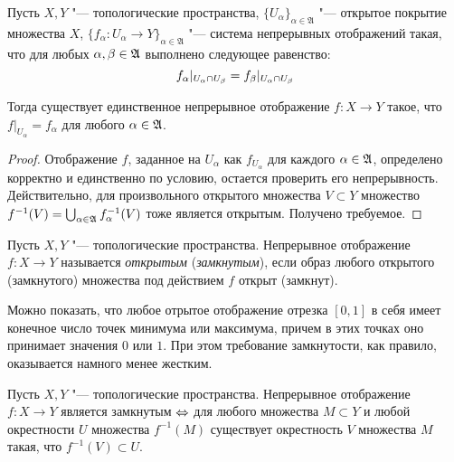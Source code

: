 \begin{theorem}
	Пусть $X, Y$ "--- топологические пространства, $\{U_\alpha \}_{\alpha \in \mathfrak{A}}$ "--- открытое покрытие множества $X$, $\{f_\alpha: U_\alpha \rightarrow Y\}_{\alpha \in \mathfrak{A}}$ "--- сис\-те\-ма непрерывных отображений такая, что для любых $\alpha, \beta \in \mathfrak A$ выполнено следующее равенство:
	\[f_\alpha|_{U_\alpha\cap U_\beta} \hm= f_\beta|_{U_\alpha\cap U_\beta}\]
	
	Тогда существует единственное непрерывное отображение $f: X\rightarrow Y$ такое, что $f|_{U_\alpha} = f_\alpha$ для любого $\alpha \in \mathfrak A$.
\end{theorem}

\begin{proof}
	Отображение $f$, заданное на $U_\alpha$ как $f_{U_\alpha}$ для каждого $\alpha \in \mathfrak A$, определено корректно и единственно по условию, остается проверить его непрерывность. Действительно, для произвольного открытого множества $V \subset Y$ множество $f^{-1}(V) = \bigcup_{\alpha \in \mathfrak A}f_\alpha^{-1}(V)$ тоже является открытым. Получено требуемое.
\end{proof}

\begin{definition}
	Пусть $X, Y$ "--- топологические пространства. Непрерывное отображение $f : X \to Y$ называется \textit{открытым} (\textit{замкнутым}), если образ любого открытого (замкнутого) множества под действием $f$ открыт (замкнут).
\end{definition}

\begin{note}
	Можно показать, что любое отрытое отображение отрезка $[0, 1]$ в себя имеет конечное число точек минимума или максимума, причем в этих точках оно принимает значения $0$ или $1$. При этом требование замкнутости, как правило, оказывается намного менее жестким.
\end{note}

\begin{proposition}
	Пусть $X, Y$ "--- топологические пространства. Непрерывное отображение $f : X \to Y$ является замкнутым $\Leftrightarrow$ для любого множества $M \subset Y$ и любой окрестности $U$ множества $f^{-1}(M)$ существует окрестность $V$ множества $M$ такая, что $f^{-1}(V) \subset U$.
\end{proposition}

